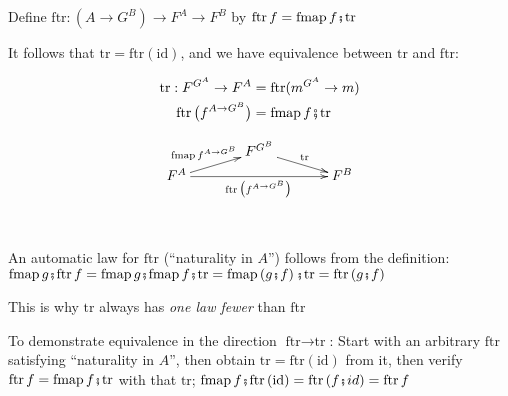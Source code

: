Define {\footnotesize{}$\text{ftr}:\left(A\rightarrow G^{B}\right)\rightarrow F^{A}\rightarrow F^{B}$}
by {\footnotesize{}$\text{ftr}\,f=\text{fmap}\,f\bef\text{tr}$} 

It follows that {\footnotesize{}$\text{tr}=\text{ftr}\left(\text{id}\right)$},
and we have equivalence between {\footnotesize{}$\text{tr}$} and
{\footnotesize{}$\text{ftr}$}:\texttt{\textcolor{blue}{\footnotesize{} }}%
\begin{minipage}[c][1\totalheight][t]{0.4\columnwidth}%
{\footnotesize{}
\begin{align*}
\text{tr}:F^{G^{A}}\rightarrow F^{A} & =\text{ftr}(m^{G^{A}}\rightarrow m)\\
\text{ftr}\,\big(f^{A\rightarrow G^{B}}\big) & =\text{fmap}\,f\bef\text{tr}
\end{align*}
}%
\end{minipage}\texttt{\textcolor{blue}{\footnotesize{}\hfill{}}}%
\begin{minipage}[c][1\totalheight][t]{0.4\columnwidth}%
{\footnotesize{}
\[
\xymatrix{\xyScaleY{0.2pc}\xyScaleX{3pc} & F^{G^{B}}\ar[rd]\sp(0.5){\ \text{tr}\ }\\
F^{A}\ar[ru]\sp(0.5){\text{fmap}\,f^{A\rightarrow G^{B}}\ }\ar[rr]\sb(0.5){\text{ftr}\,\big(f^{A\rightarrow G^{B}}\big)\,} &  & F^{B}
}
\]
}%
\end{minipage}\texttt{\textcolor{blue}{\footnotesize{}\  \  \ \hfill{}}}{\footnotesize\par}

An automatic law for {\footnotesize{}$\text{ftr}$} (``naturality
in $A$'') follows from the definition: {\footnotesize{}$\text{fmap}\,g\bef\text{ftr}\,f=\text{fmap}\,g\bef\text{fmap}\,f\bef\text{tr}=\text{fmap}\left(g\bef f\right)\bef\text{tr}=\text{ftr}\left(g\bef f\right)$} 

This is why {\footnotesize{}$\text{tr}$} always has \emph{one law
fewer} than {\footnotesize{}$\text{ftr}$}{\footnotesize\par}

To demonstrate equivalence in the direction {\footnotesize{}$\text{ftr}\rightarrow\text{tr}$}:
Start with an arbitrary {\footnotesize{}$\text{ftr}$} satisfying
``naturality in $A$'', then obtain {\footnotesize{}$\text{tr}=\text{ftr}\left(\text{id}\right)$}
from it, then verify {\footnotesize{}$\text{ftr}\,f=\text{fmap}\,f\bef\text{tr}$}
with that {\footnotesize{}$\text{tr}$}; {\footnotesize{}$\text{fmap}\,f\bef\text{ftr}\left(\text{id}\right)=\text{ftr}\left(f\bef id\right)=\text{ftr}\,f$}{\footnotesize\par}


